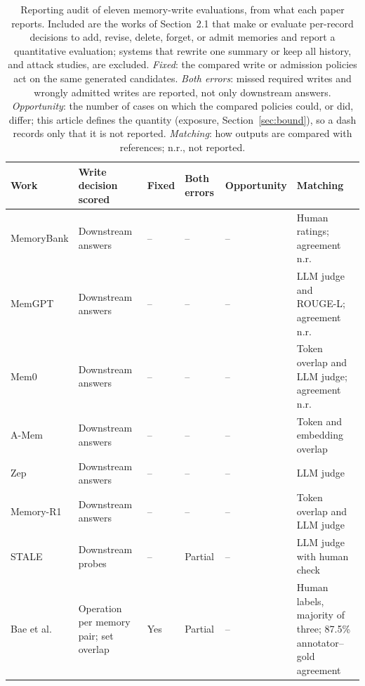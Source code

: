 \documentclass[acmsmall,review,anonymous]{acmart}
\begin{document}
\begin{table}[tbp]
\centering
\caption{Reporting audit of eleven memory-write evaluations, from what each paper reports. Included are the works of Section~2.1 that make or evaluate per-record decisions to add, revise, delete, forget, or admit memories and report a quantitative evaluation; systems that rewrite one summary or keep all history, and attack studies, are excluded. \emph{Fixed}: the compared write or admission policies act on the same generated candidates. \emph{Both errors}: missed required writes and wrongly admitted writes are reported, not only downstream answers. \emph{Opportunity}: the number of cases on which the compared policies could, or did, differ; this article defines the quantity (exposure, Section~\ref{sec:bound}), so a dash records only that it is not reported. \emph{Matching}: how outputs are compared with references; n.r., not reported.}\label{tab:1}
\footnotesize
\setlength{\tabcolsep}{3pt}
\begin{tabular}{@{}>{\raggedright\arraybackslash}p{}>{\raggedright\arraybackslash}p{}>{\raggedright\arraybackslash}p{}>{\raggedright\arraybackslash}p{}>{\raggedright\arraybackslash}p{}>{\raggedright\arraybackslash}p{}@{}}
\toprule
\textbf{Work} & \textbf{Write decision scored} & \textbf{Fixed} & \textbf{Both errors} & \textbf{Opportunity} & \textbf{Matching} \\
\midrule
MemoryBank \cite{cite47} & Downstream answers & -- & -- & -- & Human ratings; agreement n.r. \\
MemGPT \cite{cite21} & Downstream answers & -- & -- & -- & LLM judge and ROUGE-L; agreement n.r. \\
Mem0 \cite{cite6} & Downstream answers & -- & -- & -- & Token overlap and LLM judge; agreement n.r. \\
A-Mem \cite{cite39} & Downstream answers & -- & -- & -- & Token and embedding overlap \\
Zep \cite{cite26} & Downstream answers & -- & -- & -- & LLM judge \\
Memory-R1 \cite{cite40} & Downstream answers & -- & -- & -- & Token overlap and LLM judge \\
STALE \cite{cite50} & Downstream probes & -- & Partial & -- & LLM judge with human check \\
Bae et al. \cite{cite4} & Operation per memory pair; set overlap & Yes & Partial & -- & Human labels, majority of three; 87.5\% annotator--gold agreement \\

\end{tabular}
\end{table}
\end{document}

